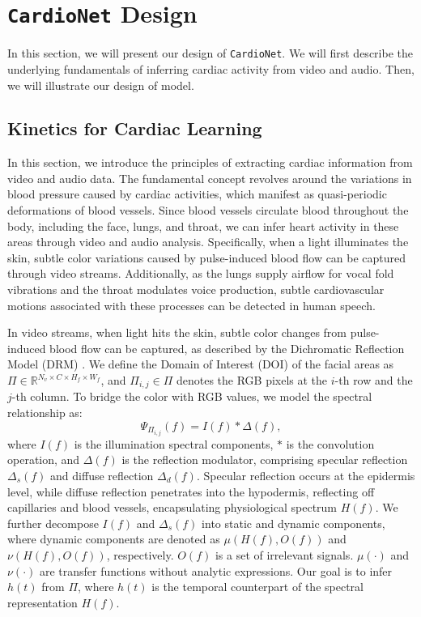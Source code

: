 \section{\texttt{C\MakeLowercase{ardio}N\MakeLowercase{et}} Design}
\label{sec: cardionet}
In this section, we will present our design of  \texttt{CardioNet}. We will first describe the underlying fundamentals of inferring cardiac activity from video and audio. Then, we will illustrate our design of model. 


\subsection{Kinetics for Cardiac Learning}
\label{subsec: principle}
In this section, we introduce the principles of extracting cardiac information from video and audio data.  
The fundamental concept revolves around the variations in blood pressure caused by cardiac activities, which manifest as quasi-periodic deformations of blood vessels. 
Since blood vessels circulate blood throughout the body, including the face, lungs, and throat,  we can infer heart activity in these areas through video and audio analysis. 
Specifically, when a light illuminates the skin, subtle color variations caused by pulse-induced blood flow can be captured through video streams. Additionally, as the lungs supply airflow for vocal fold vibrations and the throat modulates voice production, subtle cardiovascular motions associated with these processes can be detected in human speech.

In video streams, when light hits the skin, subtle color changes from pulse-induced blood flow can be captured, as described by the Dichromatic Reflection Model (DRM) \cite{shafer1985using}. We define the Domain of Interest (DOI) of the facial areas as $\Pi \in \mathbb{R}^{N_v \times C \times H_f \times W_f}$, and $\Pi_{i,j} \in \Pi$ denotes the RGB pixels at the $i$-th row and the $j$-th column. To bridge the color with RGB values, we model the spectral relationship as:
\begin{equation}
\label{eq: video_principle}
    \Psi_{\Pi_{i,j}}(f) = I(f) \ast \Delta(f),
\end{equation}
where $I(f)$ is the illumination spectral components, $\ast$ is the convolution operation, and $\Delta(f)$ is the reflection modulator, comprising specular reflection $\Delta_s(f)$ and diffuse reflection $\Delta_d(f)$. Specular reflection occurs at the epidermis level, while diffuse reflection penetrates into the hypodermis, reflecting off capillaries and blood vessels, encapsulating physiological spectrum $H(f)$. We further decompose $I(f)$ and $\Delta_s(f)$ into static and dynamic components, where dynamic components are denoted as $\mu(H(f), O(f))$ and $\nu(H(f), O(f))$, respectively. $O(f)$ is a set of irrelevant signals. $\mu(\cdot)$ and $\nu(\cdot)$ are transfer functions without analytic expressions. Our goal is to infer $h(t)$ from $\Pi$, where $h(t)$ is the temporal counterpart of the spectral representation $H(f)$.

